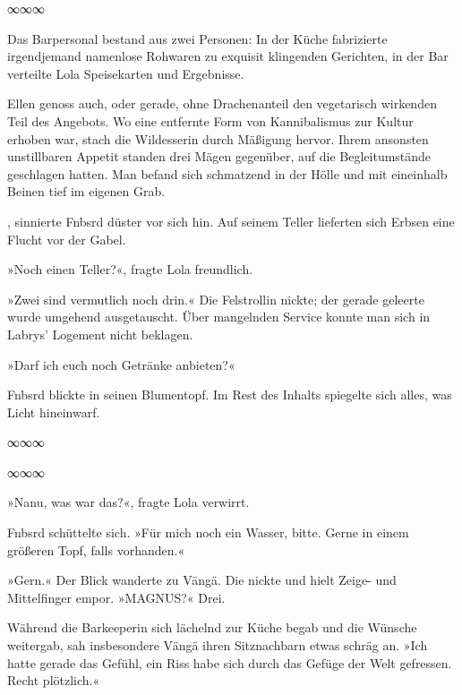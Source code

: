 \begin{center}
∞∞∞
\end{center}

Das Barpersonal bestand aus zwei Personen: In der Küche fabrizierte irgendjemand namenlose Rohwaren zu exquisit klingenden Gerichten, in der Bar verteilte Lola Speisekarten und Ergebnisse.

Ellen genoss auch, oder gerade, ohne Drachenanteil den vegetarisch wirkenden Teil des Angebots. Wo eine entfernte Form von Kannibalismus zur Kultur erhoben war, stach die Wildesserin durch Mäßigung hervor. Ihrem ansonsten unstillbaren Appetit standen drei Mägen gegenüber, auf die Begleitumstände geschlagen hatten. Man befand sich schmatzend in der Hölle und mit eineinhalb Beinen tief im eigenen Grab.

, sinnierte Fnbsrd düster vor sich hin. Auf seinem Teller lieferten sich Erbsen eine Flucht vor der Gabel.

»Noch einen Teller?«, fragte Lola freundlich.

»Zwei sind vermutlich noch drin.« Die Felstrollin nickte; der gerade geleerte wurde umgehend ausgetauscht. Über mangelnden Service konnte man sich in Labrys’ Logement nicht beklagen.

»Darf ich euch noch Getränke anbieten?«

Fnbsrd blickte in seinen Blumentopf. Im Rest des Inhalts spiegelte sich alles, was Licht hineinwarf.

\begin{center}
∞∞∞
\end{center}


\begin{center}
∞∞∞
\end{center}

»Nanu, was war das?«, fragte Lola verwirrt.

Fnbsrd schüttelte sich. »Für mich noch ein Wasser, bitte. Gerne in einem größeren Topf, falls vorhanden.«

»Gern.« Der Blick wanderte zu Vängä. Die nickte und hielt Zeige- und Mittelfinger empor. »MAGNUS?« Drei.

Während die Barkeeperin sich lächelnd zur Küche begab und die Wünsche weitergab, sah insbesondere Vängä ihren Sitznachbarn etwas schräg an. »Ich hatte gerade das Gefühl, ein Riss habe sich durch das Gefüge der Welt gefressen. Recht plötzlich.«

